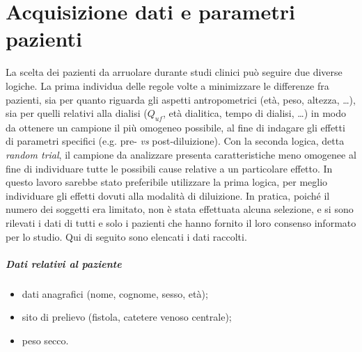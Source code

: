 \chapter {Acquisizione dati e parametri pazienti}

La scelta dei pazienti da arruolare durante studi clinici può seguire due diverse logiche. La prima individua delle regole volte a minimizzare le differenze fra pazienti, sia per quanto riguarda gli aspetti antropometrici (età, peso, altezza, \ldots), sia per quelli relativi alla dialisi ($Q_{uf}$, età dialitica, tempo di dialisi, \ldots) in modo da ottenere un campione il più omogeneo possibile, al fine di indagare gli effetti di parametri specifici (e.g. pre- \textit{vs} post-diluizione). Con la seconda logica, detta \textit{random trial}, il campione da analizzare presenta caratteristiche meno omogenee al fine di individuare tutte le possibili cause relative a un particolare effetto. 
In questo lavoro sarebbe stato preferibile utilizzare la prima logica, per meglio individuare gli effetti dovuti alla modalità di diluizione.
In pratica, poiché il numero dei soggetti era limitato, non è stata effettuata alcuna selezione, e si sono rilevati i dati di tutti e solo i pazienti che hanno fornito il loro consenso informato per lo studio.
Qui di seguito sono elencati i dati raccolti.
\paragraph{Dati relativi al paziente}
\begin{itemize}
	\item dati anagrafici (nome, cognome, sesso, età);
	\item sito di prelievo (fistola, catetere venoso centrale);
	\item peso secco.
\end{itemize}

